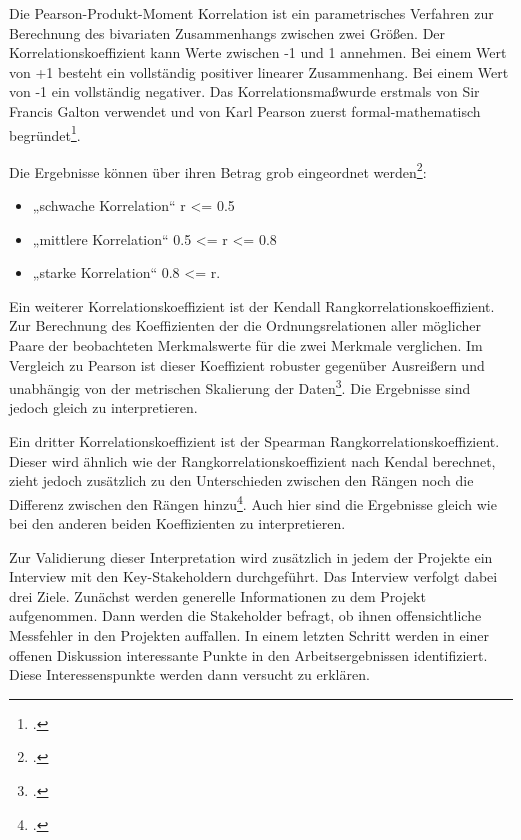 Die Pearson-Produkt-Moment Korrelation ist ein parametrisches Verfahren
zur Berechnung des bivariaten Zusammenhangs zwischen zwei Grö\ss en. Der
Korrelationskoeffizient kann Werte zwischen -1 und 1 annehmen. Bei einem
Wert von +1 besteht ein vollständig positiver linearer Zusammenhang. Bei
einem Wert von -1 ein vollständig negativer. Das Korrelationsma\ss  wurde
erstmals von Sir Francis Galton verwendet und von Karl Pearson zuerst
formal-mathematisch begründet\footcite[Vgl. ][S. 116]{brucklerGeschichteMathematikKompakt2018}.

Die Ergebnisse können über ihren Betrag grob eingeordnet
werden\footcite[Vgl. ][S. 130]{fahrmeirStatistikWegZur2016}:

\begin{itemize}
\item
    „schwache Korrelation`` r <= 0.5
\item
    „mittlere Korrelation`` 0.5 <= r <= 0.8
\item
    „starke Korrelation`` 0.8 <= r.
\end{itemize}

Ein weiterer Korrelationskoeffizient ist der Kendall
Rangkorrelationskoeffizient. Zur Berechnung des Koeffizienten der die
Ordnungsrelationen aller möglicher Paare der beobachteten Merkmalswerte
für die zwei Merkmale verglichen. Im Vergleich zu Pearson ist dieser
Koeffizient robuster gegenüber Ausrei\ss ern und unabhängig von der
metrischen Skalierung der Daten\footcite[Vgl. ][S. 137ff]{fahrmeirStatistikWegZur2016}. Die Ergebnisse sind jedoch gleich zu interpretieren.

Ein dritter Korrelationskoeffizient ist der Spearman
Rangkorrelationskoeffizient. Dieser wird ähnlich wie der
Rangkorrelationskoeffizient nach Kendal berechnet, zieht jedoch
zusätzlich zu den Unterschieden zwischen den Rängen noch die Differenz
zwischen den Rängen hinzu\footcite[Vgl. ][S. 133f]{fahrmeirStatistikWegZur2016}.
Auch hier sind die Ergebnisse gleich wie bei den anderen beiden
Koeffizienten zu interpretieren.

Zur Validierung dieser Interpretation wird zusätzlich in jedem der
Projekte ein Interview mit den Key-Stakeholdern durchgeführt. Das
Interview verfolgt dabei drei Ziele. Zunächst werden generelle
Informationen zu dem Projekt aufgenommen. Dann werden die Stakeholder
befragt, ob ihnen offensichtliche Messfehler in den Projekten auffallen.
In einem letzten Schritt werden in einer offenen Diskussion interessante
Punkte in den Arbeitsergebnissen identifiziert. Diese Interessenspunkte
werden dann versucht zu erklären.

